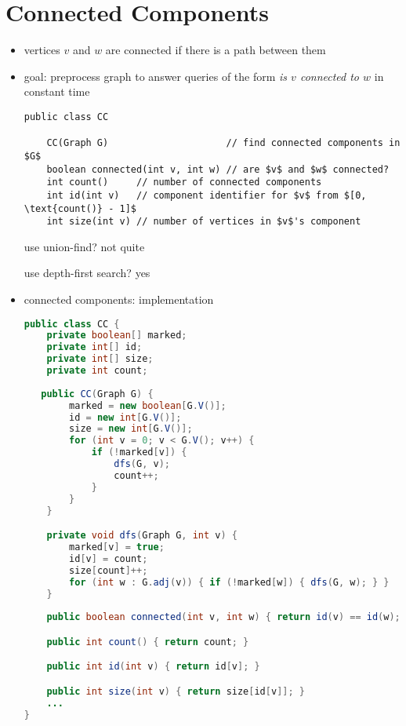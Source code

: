 \documentclass[8pt,a4paper,compress]{beamer}
\begin{document}
\section{Connected Components}
\begin{frame}[fragile]
\begin{itemize}
\item vertices $v$ and $w$ are connected if there is a path between them

\item goal: preprocess graph to answer queries of the form \emph{is $v$ connected to $w$} in constant time

\begin{lstlisting}[language={},mathescape]
public class CC

    CC(Graph G)                     // find connected components in $G$
    boolean connected(int v, int w) // are $v$ and $w$ connected?
    int count()     // number of connected components
    int id(int v)   // component identifier for $v$ from $[0, \text{count()} - 1]$
    int size(int v) // number of vertices in $v$'s component
\end{lstlisting} 

\smallskip

use union-find? not quite

\smallskip

use depth-first search? yes
\end{itemize}
\end{frame}

\begin{frame}[fragile]
\begin{itemize}
\item connected components: implementation
\begin{lstlisting}[language=Java]
public class CC {
    private boolean[] marked; 
    private int[] id; 
    private int[] size;  
    private int count;  
    
   public CC(Graph G) {
        marked = new boolean[G.V()];
        id = new int[G.V()];
        size = new int[G.V()];
        for (int v = 0; v < G.V(); v++) {
            if (!marked[v]) {
                dfs(G, v);
                count++;
            }
        }
    }

    private void dfs(Graph G, int v) {
        marked[v] = true;
        id[v] = count;
        size[count]++;
        for (int w : G.adj(v)) { if (!marked[w]) { dfs(G, w); } }
    }
    
    public boolean connected(int v, int w) { return id(v) == id(w); }

    public int count() { return count; }

    public int id(int v) { return id[v]; }

    public int size(int v) { return size[id[v]]; }
    ...
}
\end{lstlisting} 
\end{itemize}
\end{frame}
\end{document}
